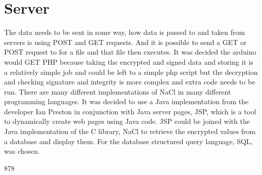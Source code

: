 \section{Server}

The data needs to be sent in some way, how data is passed to and taken from servers is using POST and GET requests. And it is possible to send a GET or POST request to for a file and that file then executes. It was decided the arduino would GET PHP because taking the encrypted and signed data and storing it is a relatively simple job and could be left to a simple php script but the decryption and checking signature and integrity is more complex and extra code needs to be run. There are many different implementations of NaCl in many different programming languages. It was decided to use a Java implementation from the developer Ian Preston in conjunction with Java server pages, JSP, which is a tool to dynamically create web pages using Java code. JSP could be joined with the Java implementation of the C library, NaCl to retrieve the encrypted values from a database and display them. For the database structured query language, SQL, was chosen.

878